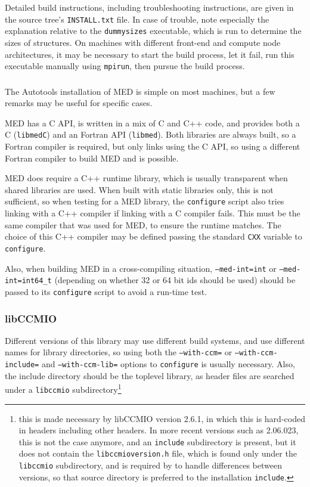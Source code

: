 \documentclass[a4paper,10pt,twoside]{csshortdoc}
\begin{document}
Detailed build instructions, including troubleshooting instructions,
are given in the source tree's \texttt{INSTALL.txt} file.
In case of trouble, note especially the explanation relative to the
\texttt{dummysizes} executable, which is run to determine the
sizes of structures. On machines with different front-end and
compute node architectures, it may be necessary
to start the build process, let it fail, run this executable
manually using \texttt{mpirun}, then pursue the build process.

\subsubsection{\med\label{sec:ext:med}}

The Autotools installation of MED is simple on most machines,
but a few remarks may be useful for specific cases.

MED has a C API, is written in a mix of C and C++ code,
and provides both a C (\texttt{libmedC}) and an Fortran API
(\texttt{libmed}). Both libraries are always built, so a Fortran
compiler is required, but \CS only links using the C API, so using
a different Fortran compiler to build MED and \CS is possible.

MED does require a C++ runtime library, which is usually transparent
when shared libraries are used. When built with static libraries
only, this is not sufficient, so when testing for a MED library,
the \CS \texttt{configure} script also tries linking with a C++
compiler if linking with a C compiler fails. This must be the
same compiler that was used for MED, to ensure the runtime matches.
The choice of this C++ compiler may be defined passing the
standard \texttt{CXX} variable to \texttt{configure}.

Also, when building MED in a cross-compiling situation,
\texttt{--med-int=int} or \texttt{--med-int=int64\_t} (depending
on whether 32 or 64 bit ids should be used) should be
passed to its \texttt{configure} script to avoid a run-time
test.

\subsubsection{libCCMIO\label{sec:ext:libccmio}}

Different versions of this library may use different build
systems, and use different names for library directories,
so using both the \texttt{--with-ccm=} or \texttt{--with-ccm-include=}
and \texttt{--with-ccm-lib=} options to \texttt{configure} is
usually necessary.
Also, the include directory should be the toplevel library,
as header files are searched under a \texttt{libccmio}
subdirectory\footnote{this is made necessary by libCCMIO version
2.6.1, in which this is hard-coded in headers including other
headers. In more recent versions such as 2.06.023, this is not the
case anymore, and an \texttt{include} subdirectory is present, but
it does not contain the \texttt{libccmioversion.h} file, which is
found only under the \texttt{libccmio} subdirectory, and is required
by \CS to handle differences between versions, so that source
directory is preferred to the installation \texttt{include}.}
\end{document}
